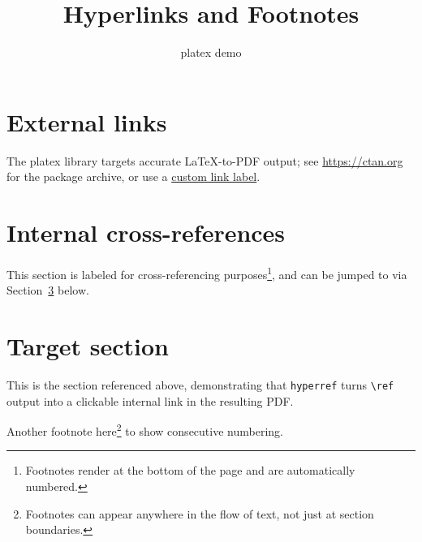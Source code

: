 \documentclass{article}
\title{Hyperlinks and Footnotes}
\author{platex demo}
\date{}
\begin{document}
\maketitle

\section{External links}
The platex library targets accurate LaTeX-to-PDF output; see
\url{https://ctan.org} for the package archive, or use a
\href{https://ctan.org}{custom link label}.

\section{Internal cross-references}
This section is labeled for cross-referencing purposes\footnote{Footnotes
render at the bottom of the page and are automatically numbered.}, and can
be jumped to via Section~\ref{sec:target} below.

\section{Target section}
\label{sec:target}
This is the section referenced above, demonstrating that \texttt{hyperref}
turns \texttt{\textbackslash ref} output into a clickable internal link in
the resulting PDF.

Another footnote here\footnote{Footnotes can appear anywhere in the flow of
text, not just at section boundaries.} to show consecutive numbering.
\end{document}
